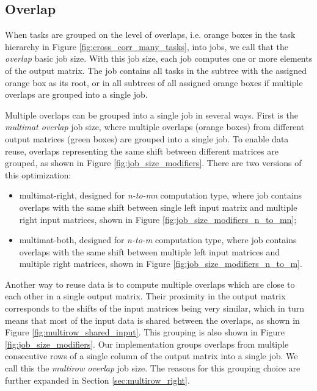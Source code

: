 \subsection{Overlap}
\label{sec:data_reuse_overlap}

When tasks are grouped on the level of overlaps, i.e. orange boxes in the task hierarchy in Figure \ref{fig:cross_corr_many_tasks}, into jobs, we call that the \textit{overlap} basic job size. With this job size, each job computes one or more elements of the output matrix. The job contains all tasks in the subtree with the assigned orange box as its root, or in all subtrees of all assigned orange boxes if multiple overlaps are grouped into a single job.

Multiple overlaps can be grouped into a single job in several ways. First is the \textit{multimat overlap} job size, where multiple overlaps (orange boxes) from different output matrices (green boxes) are grouped into a single job. To enable data reuse, overlaps representing the same shift between different matrices are grouped, as shown in Figure \ref{fig:job_size_modifiers}. There are two versions of this optimization:
\begin{itemize}
	\item multimat-right, designed for \textit{n-to-mn} computation type, where job contains overlaps with the same shift between single left input matrix and multiple right input matrices, shown in Figure \ref{fig:job_size_modifiers_n_to_mn};
	\item multimat-both, designed for \textit{n-to-m} computation type, where job contains overlaps with the same shift between multiple left input matrices and multiple right matrices, shown in Figure \ref{fig:job_size_modifiers_n_to_m}.
\end{itemize}

Another way to reuse data is to compute multiple overlaps which are close to each other in a single output matrix. Their proximity in the output matrix corresponds to the shifts of the input matrices being very similar, which in turn means that most of the input data is shared between the overlaps, as shown in Figure \ref{fig:multirow_shared_input}. This grouping is also shown in Figure \ref{fig:job_size_modifiers}. Our implementation groups overlaps from multiple consecutive rows of a single column of the output matrix into a single job. We call this the \textit{multirow overlap} job size. The reasons for this grouping choice are further expanded in Section \ref{sec:multirow_right}.




